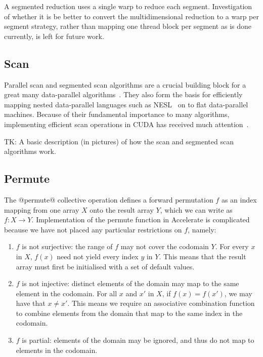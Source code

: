 A segmented reduction uses a single warp to reduce each segment. Investigation
of whether it is be better to convert the multidimensional reduction to a warp
per segment strategy, rather than mapping one thread block per segment as is
done currently, is left for future work.


\subsection{Scan}

Parallel scan and segmented scan algorithms are a crucial building block for a
great many data-parallel algorithms~\cite{Blelloch:1990ts,Chatterjee:1990vj}.
They also form the basis for efficiently mapping nested data-parallel languages
such as NESL~\cite{Blelloch:1995ut,Blelloch:1996jx} on to flat data-parallel
machines. Because of their fundamental importance to many algorithms,
implementing efficient scan operations in CUDA has received much
attention~\cite{Sengupta:2007tc,Dotsenko:2008fo,Harris:2012fy}.

TK: A basic description (in pictures) of how the scan and segmented scan algorithms work.


\subsection{Permute}

The @permute@ collective operation defines a forward permutation $f$ as an
index mapping from one array $X$ onto the result array $Y$, which we can write
as  $f : X \rightarrow Y$. Implementation of the permute function in Accelerate
is complicated because we have not placed any particular restrictions on $f$,
namely:
%
\begin{enumerate}
    \item $f$ is not surjective: the range of $f$ may not cover the codomain
        $Y$. For every $x$ in $X$, $f\left( x \right)$ need not yield every
        index $y$ in $Y$. This means that the result array must first be
        initialised with a set of default values.

    \item $f$ is not injective: distinct elements of the domain may
        map to the same element in the codomain. For all $x$ and $x'$ in $X$, if
        $f\left( x \right) = f\left( x' \right)$, we may have that $x \ne x'$.
        This means we require an associative combination function to combine
        elements from the domain that map to the same index in the codomain.

    \item $f$ is partial: elements of the domain may be ignored, and thus do
        not map to elements in the codomain.
\end{enumerate}


